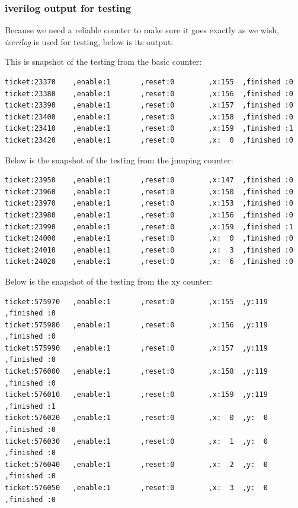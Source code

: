\documentclass[11pt]{scrartcl}
\begin{document}
\subsubsection{iverilog output for testing}
Because we need a reliable counter to make sure it goes exactly as we wish, \textit{iverilog} is used for testing, below is its output:

This is snapshot of the testing from the basic counter:
\begin{verbatim}
ticket:23370    ,enable:1       ,reset:0        ,x:155  ,finished :0
ticket:23380    ,enable:1       ,reset:0        ,x:156  ,finished :0
ticket:23390    ,enable:1       ,reset:0        ,x:157  ,finished :0
ticket:23400    ,enable:1       ,reset:0        ,x:158  ,finished :0
ticket:23410    ,enable:1       ,reset:0        ,x:159  ,finished :1
ticket:23420    ,enable:1       ,reset:0        ,x:  0  ,finished :0
\end{verbatim}
Below is the snapshot of the testing from the jumping counter:
\begin{verbatim}
ticket:23950    ,enable:1       ,reset:0        ,x:147  ,finished :0
ticket:23960    ,enable:1       ,reset:0        ,x:150  ,finished :0
ticket:23970    ,enable:1       ,reset:0        ,x:153  ,finished :0
ticket:23980    ,enable:1       ,reset:0        ,x:156  ,finished :0
ticket:23990    ,enable:1       ,reset:0        ,x:159  ,finished :1
ticket:24000    ,enable:1       ,reset:0        ,x:  0  ,finished :0
ticket:24010    ,enable:1       ,reset:0        ,x:  3  ,finished :0
ticket:24020    ,enable:1       ,reset:0        ,x:  6  ,finished :0
\end{verbatim}


Below is the snapshot of the testing from the xy counter:
\begin{verbatim}
ticket:575970   ,enable:1       ,reset:0        ,x:155  ,y:119  ,finished :0
ticket:575980   ,enable:1       ,reset:0        ,x:156  ,y:119  ,finished :0
ticket:575990   ,enable:1       ,reset:0        ,x:157  ,y:119  ,finished :0
ticket:576000   ,enable:1       ,reset:0        ,x:158  ,y:119  ,finished :0
ticket:576010   ,enable:1       ,reset:0        ,x:159  ,y:119  ,finished :1
ticket:576020   ,enable:1       ,reset:0        ,x:  0  ,y:  0  ,finished :0
ticket:576030   ,enable:1       ,reset:0        ,x:  1  ,y:  0  ,finished :0
ticket:576040   ,enable:1       ,reset:0        ,x:  2  ,y:  0  ,finished :0
ticket:576050   ,enable:1       ,reset:0        ,x:  3  ,y:  0  ,finished :0
\end{verbatim}
\end{document}
